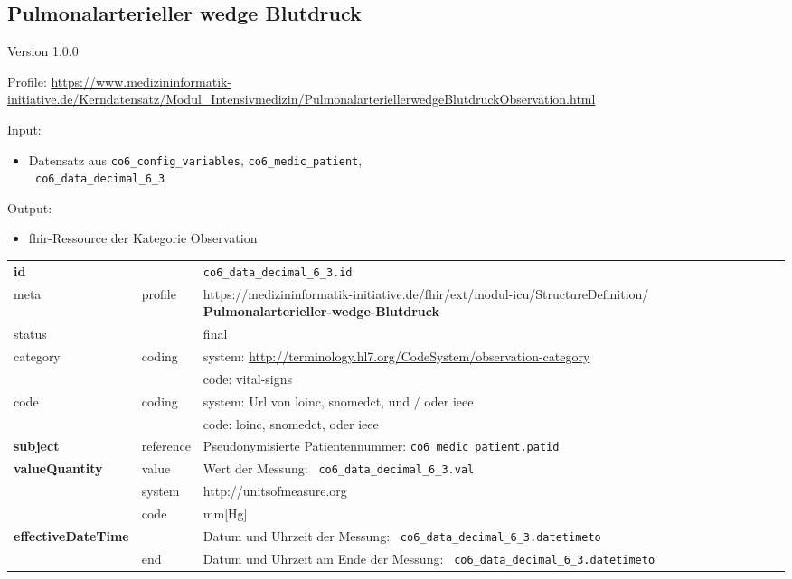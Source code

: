 \subsection{
Pulmonalarterieller wedge Blutdruck} 
\noindent Version 1.0.0

\noindent Profile: \url{https://www.medizininformatik-initiative.de/Kerndatensatz/Modul_Intensivmedizin/PulmonalarteriellerwedgeBlutdruckObservation.html}

\noindent Input:
\begin{itemize}
	\item Datensatz aus \texttt{co6\_config\_variables}, \texttt{co6\_medic\_patient}, \\ \texttt{
co6\_data\_decimal\_6\_3}
\end{itemize}
Output:
\begin{itemize}
        \item \ac{fhir}-Ressource der Kategorie \glqq Observation\grqq{}
\end{itemize}
\begin{longtable}{|l|l|p{7.5cm}|}
        \hline
        \rowcolor{lightgray} \multicolumn{3}{|l|}{Data Mapping (inhaltlich)} \\ \hline
        \textbf{id} &  & \texttt{co6\_data\_decimal\_6\_3.id} \\ \hline
	meta & profile & https://medizininformatik-initiative.de/fhir/ext/modul-icu/StructureDefinition/\textbf{
Pulmonalarterieller-wedge-Blutdruck} \\ \hline 
	status &  & final   \\ \hline 
	category & coding & system: \url{http://terminology.hl7.org/CodeSystem/observation-category} \\
\cline{3-3}
	& & code: vital-signs\\ \hline
	code & coding & system: Url von \ac{loinc}, \ac{snomedct}, und / oder \ac{ieee} \\ 
	\cline{3-3} 
	 &  & code: \ac{loinc}, \ac{snomedct}, oder \ac{ieee} \\ \hline
	 \textbf{subject}  & reference & Pseudonymisierte Patientennummer: \texttt{co6\_medic\_patient.patid} \\ \hline
	 \textbf{valueQuantity}  & value & Wert der Messung: \texttt{
co6\_data\_decimal\_6\_3.val} \\
        \cline{2-3}
         & system & http://unitsofmeasure.org \\
         \cline{2-3}
         & code & mm[Hg] \\ \hline
     \textbf{effectiveDateTime}  & & Datum und Uhrzeit der Messung: \texttt{
co6\_data\_decimal\_6\_3.datetimeto} \\
    \cline{2-3}
     & end & Datum und Uhrzeit am Ende der Messung: \texttt{
co6\_data\_decimal\_6\_3.datetimeto} \\ \hline
\end{longtable}


